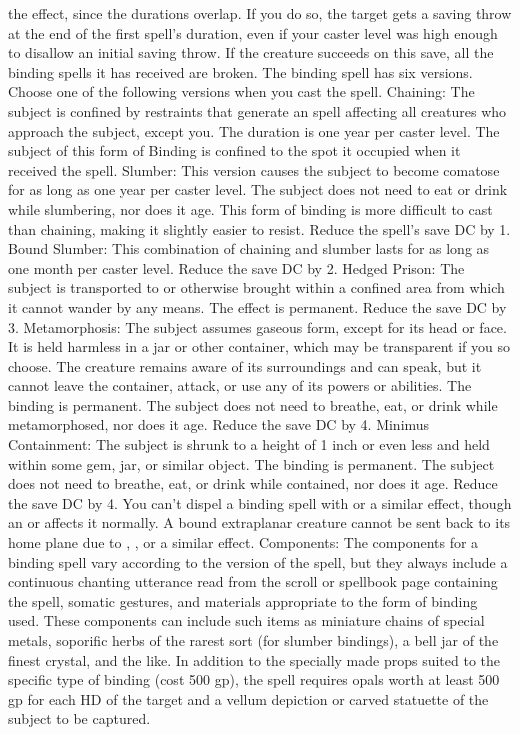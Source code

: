 the effect, since the durations overlap. If you do so, the target gets a saving
throw at the end of the first spell's duration, even if your caster level was high
enough to disallow an initial saving throw. If the creature succeeds on this save,
all the binding spells it has received are broken.
The binding spell has six versions. Choose one of the following versions
when you cast the spell.
Chaining: The subject is confined by restraints that generate an 
spell affecting all creatures who approach the subject, except you. The duration
is one year per caster level. The subject of this form of Binding is confined
to the spot it occupied when it received the spell.
Slumber: This version causes the subject to become comatose for as long
as one year per caster level. The subject does not need to eat or drink while slumbering,
nor does it age. This form of binding is more difficult to cast than chaining,
making it slightly easier to resist. Reduce the spell's save DC by 1.
Bound Slumber: This combination of chaining and slumber
lasts for as long as one month per caster level. Reduce the save DC by 2.
Hedged Prison: The subject is transported to or otherwise brought within
a confined area from which it cannot wander by any means. The effect is permanent.
Reduce the save DC by 3.
Metamorphosis: The subject assumes gaseous form, except for its head or
face. It is held harmless in a jar or other container, which may be transparent
if you so choose. The creature remains aware of its surroundings and can speak,
but it cannot leave the container, attack, or use any of its powers or abilities.
The binding is permanent. The subject does not need to breathe, eat, or
drink while metamorphosed, nor does it age. Reduce the save DC by 4.
Minimus Containment: The subject is shrunk to a height of 1 inch or even
less and held within some gem, jar, or similar object. The binding is
permanent. The subject does not need to breathe, eat, or drink while contained,
nor does it age. Reduce the save DC by 4.
You can't dispel a binding spell with  or a similar
effect, though an  or  affects
it normally. A bound extraplanar creature cannot be sent back to its home plane
due to , , or a similar effect.
Components: The components for a binding spell vary according
to the version of the spell, but they always include a continuous chanting utterance
read from the scroll or spellbook page containing the spell, somatic gestures,
and materials appropriate to the form of binding used. These components
can include such items as miniature chains of special metals, soporific herbs of
the rarest sort (for slumber bindings), a bell jar of the finest crystal,
and the like.
In addition to the specially made props suited to the specific type of binding (cost 500 gp), the spell requires opals worth at least 500 gp for each HD of the
target and a vellum depiction or carved statuette of the subject to be captured.